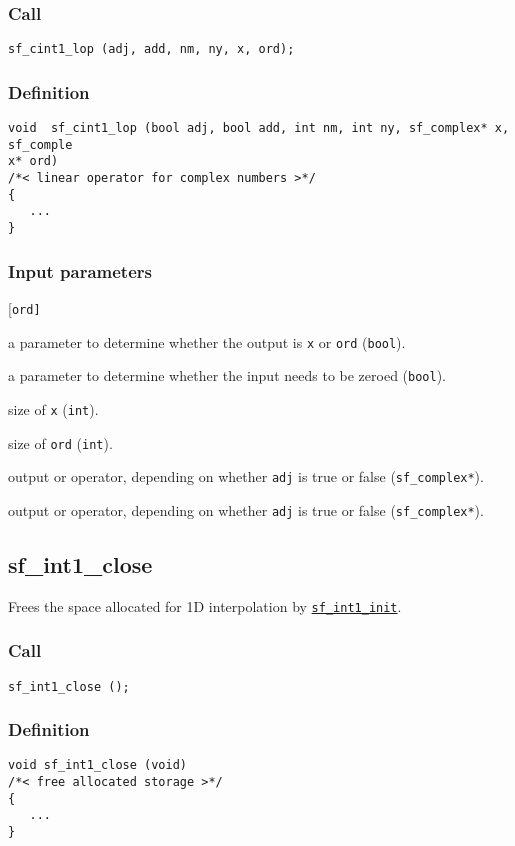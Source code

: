 \subsubsection*{Call}
\begin{verbatim}sf_cint1_lop (adj, add, nm, ny, x, ord);\end{verbatim}

\subsubsection*{Definition}
\begin{verbatim}
void  sf_cint1_lop (bool adj, bool add, int nm, int ny, sf_complex* x, sf_comple
x* ord)
/*< linear operator for complex numbers >*/
{ 
   ...
}
\end{verbatim}

\subsubsection*{Input parameters}
\begin{desclist}{\tt }{\quad}[\tt ord]
   \setlength\itemsep{0pt}
   \item[adj] a parameter to determine whether the output is \texttt{x} or \texttt{ord} (\texttt{bool}).
   \item[add] a parameter to determine whether the input needs to be zeroed (\texttt{bool}).
   \item[nm]  size of \texttt{x} (\texttt{int}).
   \item[ny]  size of \texttt{ord} (\texttt{int}).
   \item[x]   output or operator, depending on whether \texttt{adj} is true or false (\texttt{sf\_complex*}).
   \item[ord] output or operator, depending on whether \texttt{adj} is true or false (\texttt{sf\_complex*}).
\end{desclist}




\subsection{{sf\_int1\_close}}
Frees the space allocated for 1D interpolation by \hyperref[sec:sf_int1_init]{\texttt{sf\_int1\_init}}.

\subsubsection*{Call}
\begin{verbatim}sf_int1_close ();\end{verbatim}

\subsubsection*{Definition}
\begin{verbatim}
void sf_int1_close (void)
/*< free allocated storage >*/
{
   ...
}
\end{verbatim}


